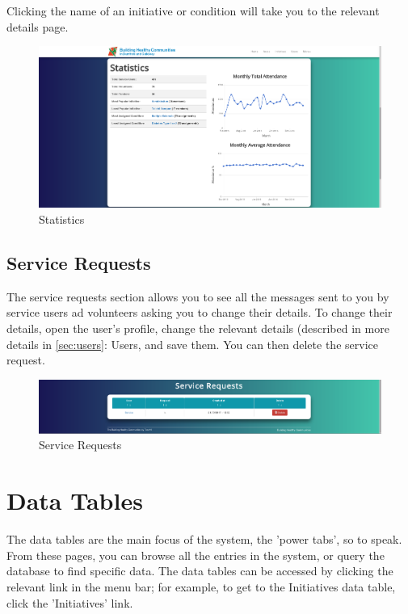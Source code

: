 \documentclass{bhcguides}
\begin{document}
Clicking the name of an initiative or condition will take you to the relevant details page.

\begin{figure}[h!]
 \centerline{\includegraphics[width=\textwidth, height=\textheight, keepaspectratio]{homepage2.png}}
 \caption{Statistics}
 \label{fig:statistics}
\end{figure}

\subsection{Service Requests}
\label{ssec:servicerequests}

The service requests section allows you to see all the messages sent to you by service users ad volunteers asking you to change their details. To change their details, open the user's profile, change the relevant details (described in more details in \autoref{sec:users}: Users, and save them. You can then delete the service request.

\begin{figure}[h!]
 \centerline{\includegraphics[width=\textwidth, height=\textheight, keepaspectratio]{homepage3.png}}
 \caption{Service Requests}
 \label{fig:serviceRequests}
\end{figure}

\pagebreak

\section{Data Tables}
\label{sec:datatables}

The data tables are the main focus of the system, the 'power tabs', so to speak. From these pages, you can browse all the entries in the system, or query the database to find specific data. The data tables can be accessed by clicking the relevant link in the menu bar; for example, to get to the Initiatives data table, click the 'Initiatives' link. 
\end{document}
